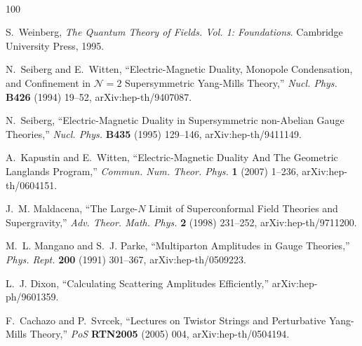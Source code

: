 \documentclass[12pt,hyperref,compress]{JHEP3}
\begin{document}
~\newpage
%
%
\providecommand{\href}[2]{#2}\begingroup\raggedright\begin{thebibliography}{100}

S.~Weinberg, {\em {The Quantum Theory of Fields. Vol. 1: Foundations}}.
\newblock Cambridge University Press,
1995.
\newblock

N.~Seiberg and E.~Witten, ``{Electric-Magnetic Duality, Monopole Condensation,
  and Confinement in $\mathcal{N}\!=\!2$ Supersymmetric Yang-Mills Theory},''
  \href{http://dx.doi.org/10.1016/0550-3213(94)90124-4}{{\em Nucl. Phys.} {\bf
  B426} (1994)  19--52},
\href{http://arxiv.org/abs/hep-th/9407087}{{ arXiv:hep-th/9407087}}.

N.~Seiberg, ``{Electric-Magnetic Duality in Supersymmetric non-Abelian Gauge
  Theories},'' \href{http://dx.doi.org/10.1016/0550-3213(94)00023-8}{{\em Nucl.
  Phys.} {\bf B435} (1995)  129--146},
\href{http://arxiv.org/abs/hep-th/9411149}{{ arXiv:hep-th/9411149}}.

A.~Kapustin and E.~Witten, ``{Electric-Magnetic Duality And The Geometric
  Langlands Program},'' {\em Commun. Num. Theor. Phys.} {\bf 1} (2007)  1--236,
\href{http://arxiv.org/abs/hep-th/0604151}{{ arXiv:hep-th/0604151}}.

J.~M. Maldacena, ``{The Large-$N$ Limit of Superconformal Field Theories and
  Supergravity},'' {\em Adv. Theor. Math. Phys.} {\bf 2} (1998)  231--252,
\href{http://arxiv.org/abs/hep-th/9711200}{{ arXiv:hep-th/9711200}}.

M.~L. Mangano and S.~J. Parke, ``{Multiparton Amplitudes in Gauge Theories},''
  \href{http://dx.doi.org/10.1016/0370-1573(91)90091-Y}{{\em Phys. Rept.} {\bf
  200} (1991)  301--367},
\href{http://arxiv.org/abs/hep-th/0509223}{{ arXiv:hep-th/0509223}}.

L.~J. Dixon, ``{Calculating Scattering Amplitudes Efficiently},''
\href{http://arxiv.org/abs/hep-ph/9601359}{{ arXiv:hep-ph/9601359}}.

F.~Cachazo and P.~Svrcek, ``{Lectures on Twistor Strings and Perturbative
  Yang-Mills Theory},'' {\em PoS} {\bf RTN2005} (2005)  004,
\href{http://arxiv.org/abs/hep-th/0504194}{{ arXiv:hep-th/0504194}}.


\end{thebibliography}
\end{document}
